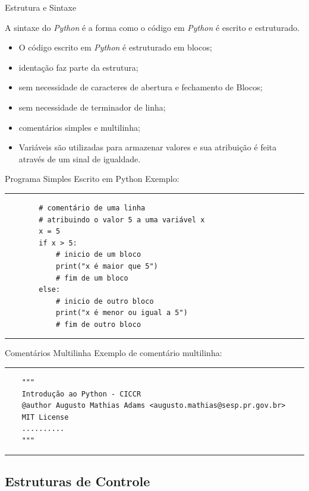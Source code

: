 \documentclass{beamer}
\begin{document}
\begin{frame}{Estrutura e Sintaxe}
	
	A sintaxe do \textit{Python} é a forma como o código em \textit{Python} é escrito e
    estruturado. 
    
    \begin{itemize}
    	\item O código escrito em \textit{Python} é estruturado em blocos;
    	\item identação faz parte da estrutura;
    	\item sem necessidade de caracteres de abertura e fechamento de Blocos;
    	\item sem necessidade de terminador de linha;
    	\item comentários simples e multilinha;
    	\item Variáveis são utilizadas para armazenar valores e sua atribuição é feita através de um sinal de igualdade.
    \end{itemize}
	
\end{frame}

\begin{frame}[fragile]{Programa Simples Escrito em Python}
	Exemplo:
	\rule{\textwidth}{1pt}
	\scriptsize
	\begin{verbatim}
		# comentário de uma linha
		# atribuindo o valor 5 a uma variável x
		x = 5
		if x > 5: 
			# inicio de um bloco
			print("x é maior que 5")
			# fim de um bloco
		else:
			# inicio de outro bloco
			print("x é menor ou igual a 5")
			# fim de outro bloco
	\end{verbatim}
	\rule{\textwidth}{1pt}
\end{frame}

\begin{frame}[fragile]{Comentários Multilinha}
	Exemplo de comentário multilinha:
	\rule{\textwidth}{1pt}
	\scriptsize
	\begin{verbatim}
	"""
	Introdução ao Python - CICCR
	@author Augusto Mathias Adams <augusto.mathias@sesp.pr.gov.br>
	MIT License
	..........
	"""
	\end{verbatim}

	\rule{\textwidth}{1pt}	
\end{frame}


\subsection{Estruturas de Controle}
\end{document}
